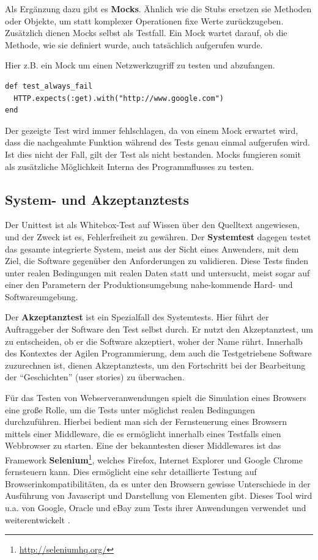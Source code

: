   
  Als Ergänzung dazu gibt es \textbf{Mocks}. Ähnlich wie die Stubs ersetzen sie Methoden oder Objekte, um statt komplexer Operationen fixe Werte zurückzugeben. Zusätzlich dienen Mocks selbst als Testfall. Ein Mock wartet darauf, ob die Methode, wie sie definiert wurde, auch tatsächlich aufgerufen wurde.
  
  Hier z.B. ein Mock um einen Netzwerkzugriff zu testen und abzufangen.
  \begin{lstlisting}
def test_always_fail
  HTTP.expects(:get).with("http://www.google.com")
end
  \end{lstlisting}
  Der gezeigte Test wird immer fehlschlagen, da von einem Mock erwartet wird, dass die nachgeahmte Funktion während des Tests genau einmal aufgerufen wird. Ist dies nicht der Fall, gilt der Test als nicht bestanden. Mocks fungieren somit als zusätzliche Möglichkeit Interna des Programmflusses zu testen. 

\subsection{System- und Akzeptanztests}
\label{sec:acceptance}
Der Unittest ist als Whitebox-Test auf Wissen über den Quelltext angewiesen, und der Zweck ist es, Fehlerfreiheit zu gewähren. Der \textbf{Systemtest} dagegen testet das gesamte integrierte System, meist aus der Sicht eines Anwenders, mit dem Ziel, die Software gegenüber den Anforderungen zu validieren. Diese Tests finden unter realen Bedingungen mit realen Daten statt und untersucht, meist sogar auf einer den Parametern der Produktionsumgebung nahe-kommende Hard- und Softwareumgebung.

Der \textbf{Akzeptanztest} ist ein Spezialfall des Systemtests. Hier führt der Auftraggeber der Software den Test selbst durch. Er nutzt den Akzeptanztest, um zu entscheiden, ob er die Software akzeptiert, woher der Name rührt.
Innerhalb des Kontextes der Agilen Programmierung, dem auch die Testgetriebene Software zuzurechnen ist, dienen Akzeptanztests, um den Fortschritt bei der Bearbeitung der "`Geschichten"' (user stories) zu überwachen.

Für das Testen von Webserveranwendungen spielt die Simulation eines Browsers eine große Rolle, um die Tests unter möglichst realen Bedingungen durchzuführen. Hierbei bedient man sich der Fernsteuerung eines Browsern mittels einer Middleware, die es ermöglicht innerhalb eines Testfalls einen Webbrowser zu starten. Eine der bekanntesten dieser Middlewares ist das Framework \textbf{Selenium}\footnote{\url{http://seleniumhq.org/}}, welches Firefox, Internet Explorer und Google Chrome fernsteuern kann. Dies ermöglicht eine sehr detaillierte Testung auf Browserinkompatibilitäten, da es unter den Browsern gewisse Unterschiede in der Ausführung von Javascript und Darstellung von Elementen gibt. Dieses Tool wird u.a. von Google, Oracle und eBay zum Tests ihrer Anwendungen verwendet und weiterentwickelt \citep{selenium_hq_selenium_2010}.
